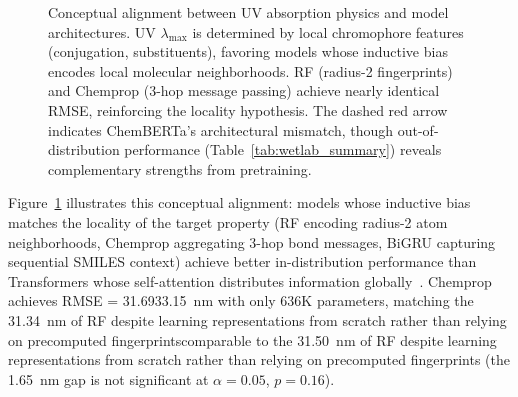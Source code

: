 \documentclass[journal=jcisd8,manuscript=article]{achemso}
\newcommand{\added}[1]{{\color{addedblue}#1}}
\newcommand{\removed}[1]{{\color{removedred}#1}}
\begin{document}
\begin{figure}[htbp]
 \caption{Conceptual alignment between UV absorption physics and model architectures. UV $\lambda_{\max}$ is determined by local chromophore features (conjugation, substituents), favoring models whose inductive bias encodes local molecular neighborhoods. RF (radius-2 fingerprints) and Chemprop (3-hop message passing) achieve nearly identical RMSE, reinforcing the locality hypothesis. The dashed red arrow indicates ChemBERTa's architectural mismatch, though out-of-distribution performance (Table~\ref{tab:wetlab_summary}) reveals complementary strengths from pretraining.}
 \label{fig:local_vs_global}
\end{figure}

Figure~\ref{fig:local_vs_global} illustrates this conceptual alignment: models whose inductive bias matches the locality of the target property (RF encoding radius-2 atom neighborhoods, Chemprop aggregating 3-hop bond messages, BiGRU capturing sequential SMILES context) achieve better in-distribution performance than Transformers whose self-attention distributes information globally~\cite{chenMolecularLanguage2023, jiang2023trangru}.
Chemprop achieves RMSE = \removed{31.69}\added{33.15}~nm with only 636K parameters, \removed{matching the 31.34~nm of RF despite learning representations from scratch rather than relying on precomputed fingerprints}\added{comparable to the 31.50~nm of RF despite learning representations from scratch rather than relying on precomputed fingerprints (the 1.65~nm gap is not significant at $\alpha = 0.05$, $p = 0.16$)}.
\end{document}
